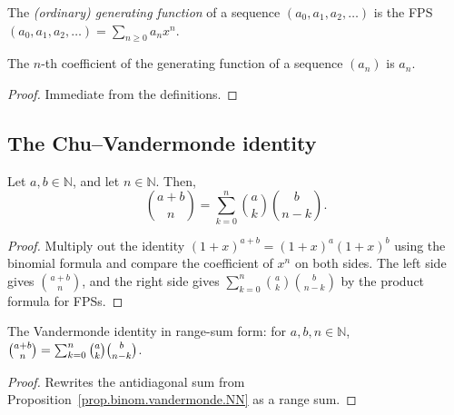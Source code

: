 \begin{definition}
\label{def.fps.gf}
\leanhelper
\leanok
The \emph{(ordinary) generating function} of a sequence $(a_0, a_1, a_2, \ldots)$
is the FPS $(a_0, a_1, a_2, \ldots) = \sum_{n\geq 0} a_n x^n$.
\end{definition}

\begin{lemma}
\label{lem.fps.gf.coeff}
\leanhelper
\leanok
The $n$-th coefficient of the generating function of a sequence $(a_n)$ is $a_n$.
\end{lemma}

\begin{proof}
\leanok
Immediate from the definitions.
\end{proof}

\subsection{The Chu--Vandermonde identity}

\begin{proposition}
\label{prop.binom.vandermonde.NN}
\leantarget
\leanok
Let $a,b\in\mathbb{N}$, and let
$n\in\mathbb{N}$. Then,
\[
\binom{a+b}{n}=\sum_{k=0}^{n}\binom{a}{k}\binom{b}{n-k}.
\]
\end{proposition}

\begin{proof}
Multiply out the identity $\left(1+x\right)^{a+b}=\left(1+x\right)^{a}\left(1+x\right)^{b}$
using the binomial formula and compare the coefficient of $x^{n}$ on both sides.
The left side gives $\binom{a+b}{n}$, and the right side gives
$\sum_{k=0}^{n}\binom{a}{k}\binom{b}{n-k}$ by the product formula for FPSs.
\end{proof}

\begin{lemma}
\label{lem.fps.vandermonde_nat_range}
\leanhelper
\leanok
The Vandermonde identity in range-sum form:
for $a, b, n \in \mathbb{N}$,
$\dbinom{a+b}{n} = \sum_{k=0}^{n}\dbinom{a}{k}\dbinom{b}{n-k}$.
\end{lemma}

\begin{proof}
\leanok
Rewrites the antidiagonal sum from Proposition~\ref{prop.binom.vandermonde.NN}
as a range sum.
\end{proof}

